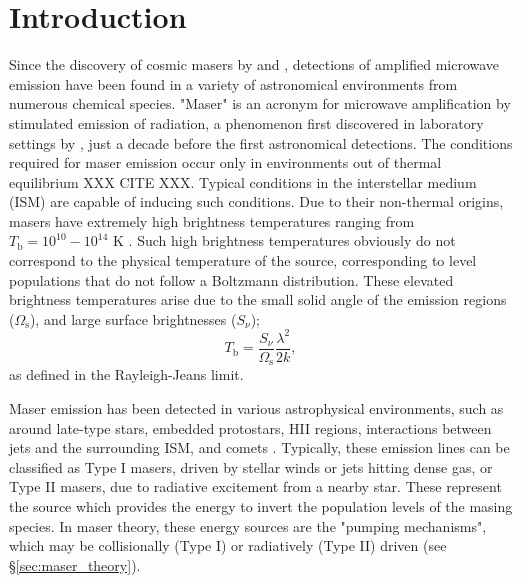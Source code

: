 \section{Introduction}
\label{sec:intro}

Since the discovery of cosmic masers by \citet{gundermann1965} and \citet{WEAVER_1965}, detections of amplified microwave emission have been found in a variety of astronomical environments from numerous chemical species. "Maser" is an acronym for microwave amplification by stimulated emission of radiation, a phenomenon first discovered in laboratory settings by \cite{Gordon_1955}, just a decade before the first astronomical detections. The conditions required for maser emission occur only in environments out of thermal equilibrium XXX CITE XXX. Typical conditions in the interstellar medium (ISM) are capable of inducing such conditions. Due to their non-thermal origins, masers have extremely high brightness temperatures ranging from $T_{\mathrm{b}} = 10^{10}-10^{14}$ K \citep{lo2005}. Such high brightness temperatures obviously do not correspond to the physical temperature of the source, corresponding to level populations that do not follow a Boltzmann distribution. These elevated brightness temperatures arise due to the small solid angle of the emission regions ($\Omega_{\mathrm{s}}$), and large surface brightnesses ($S_\nu$);
\begin{equation}
\label{eq:temp_bright}
T_{\mathrm{b}} = \frac{S_\nu}{\Omega_{\mathrm{s}}} \frac{\lambda^2}{2k},
\end{equation}
as defined in the Rayleigh-Jeans limit.

Maser emission has been detected in various astrophysical environments, such as around late-type stars, embedded protostars, HII regions, interactions between jets and the surrounding ISM, and comets \citep{lo2005}. Typically, these emission lines can be classified as Type I masers, driven by stellar winds or jets hitting dense gas, or Type II masers, due to radiative excitement from a nearby star. These represent the source which provides the energy to invert the population levels of the masing species. In maser theory, these energy sources are the "pumping mechanisms", which may be collisionally (Type I) or radiatively (Type II) driven (see \S\ref{sec:maser_theory}).

